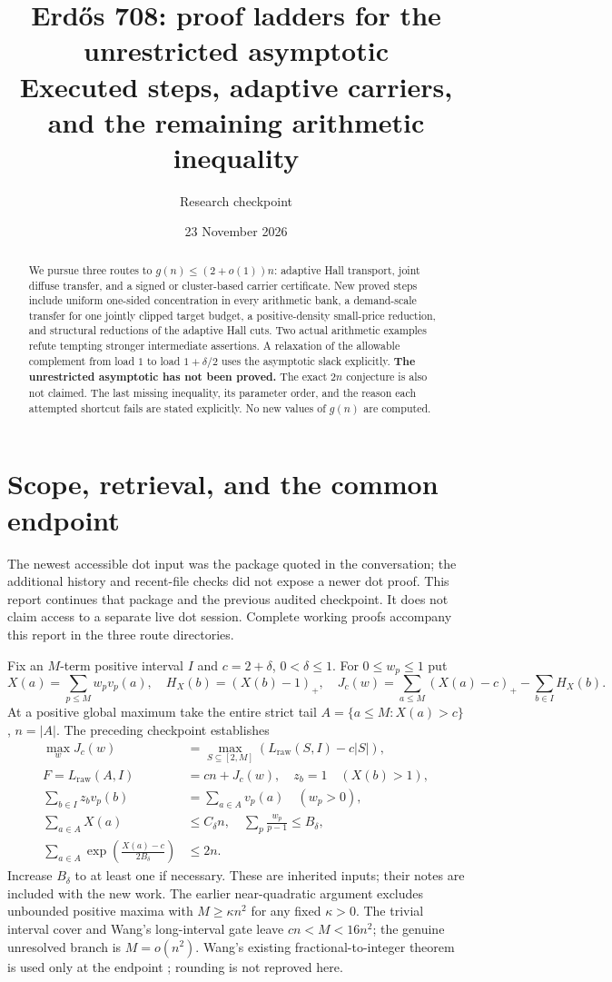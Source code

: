 \documentclass[11pt,a4paper]{article}
\title{Erd\H{o}s 708: proof ladders for the unrestricted asymptotic\\
\large Executed steps, adaptive carriers, and the remaining arithmetic inequality}
\author{Research checkpoint}
\date{23 November 2026}
\newcommand{\pos}[1]{\left(#1\right)_+}
\newcommand{\LP}{L_{\mathrm{raw}}}
\begin{document}
\maketitle
\begin{abstract}
We pursue three routes to $g(n)\le(2+o(1))n$: adaptive Hall transport,
joint diffuse transfer, and a signed or cluster-based carrier certificate.
New proved steps include uniform one-sided concentration in every arithmetic
bank, a demand-scale transfer for one jointly clipped target budget, a
positive-density small-price reduction, and structural reductions of the
adaptive Hall cuts. Two actual arithmetic examples refute tempting stronger
intermediate assertions. A relaxation of the allowable complement from load
$1$ to load $1+\delta/2$ uses the asymptotic slack explicitly.
\textbf{The unrestricted asymptotic has not been proved.} The exact $2n$
conjecture is also not claimed. The last missing inequality, its parameter
order, and the reason each attempted shortcut fails are stated explicitly.
No new values of $g(n)$ are computed.
\end{abstract}

\section{Scope, retrieval, and the common endpoint}

The newest accessible dot input was the package quoted in the conversation;
the additional history and recent-file checks did not expose a newer dot
proof. This report continues that package and the previous audited checkpoint.
It does not claim access to a separate live dot session. Complete working
proofs accompany this report in the three route directories.

Fix an $M$-term positive interval $I$ and $c=2+\delta$, $0<\delta\le1$.
For $0\le w_p\le1$ put
\[
 X(a)=\sum_{p\le M}w_pv_p(a),\quad
 H_X(b)=\pos{X(b)-1},\quad
 J_c(w)=\sum_{a\le M}\pos{X(a)-c}-\sum_{b\in I}H_X(b).
\]
At a positive global maximum take the entire strict tail
$A=\{a\le M:X(a)>c\}$, $n=|A|$. The preceding checkpoint establishes
\begin{align}
 \max_wJ_c(w)&=\max_{S\subseteq[2,M]}(\LP(S,I)-c|S|),\label{global}\\
 F=\LP(A,I)&=cn+J_c(w),\quad z_b=1\quad(X(b)>1),\label{paired}\\
 \sum_{b\in I}z_bv_p(b)&=\sum_{a\in A}v_p(a)\quad(w_p>0),\label{rows}\\
 \sum_{a\in A}X(a)&\le C_\delta n,\quad
 \sum_p\frac{w_p}{p-1}\le B_\delta,\label{bounds}\\
 \sum_{a\in A}\exp\left(\frac{X(a)-c}{2B_\delta}\right)&\le2n.
 \label{mgf}
\end{align}
Increase $B_\delta$ to at least one if necessary. These are inherited inputs;
their notes are included with the new work. The earlier near-quadratic
argument excludes unbounded positive maxima with $M\ge\kappa n^2$ for any
fixed $\kappa>0$. The trivial interval cover and Wang's long-interval gate
leave $cn<M<16n^2$; the genuine unresolved branch is $M=o(n^2)$.
Wang's existing fractional-to-integer theorem is used only at the endpoint
\cite{WangRaw,WangMain}; rounding is not reproved here.
\end{document}
